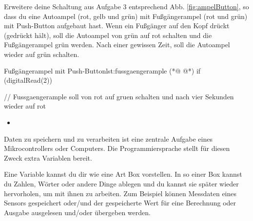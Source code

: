 Erweitere deine Schaltung aus Aufgabe 3 entsprechend Abb. \ref{fig:ampelButton}, so dass du eine Autoampel (rot, gelb und grün) mit Fußgängerampel (rot und grün) mit Push-Button aufgebaut hast. Wenn ein Fußgänger auf den Kopf drückt (gedrückt hält), soll die Autoampel von grün auf rot schalten und die Fußgängerampel grün werden. Nach einer gewissen Zeit, soll die Autoampel wieder auf grün schalten.


\begin{multicols}{2}
\null\vfill 
\begin{arduinoCode}{Fußgängerampel mit Push-Button}{lst:fussgaengerample}
         (*@  @*)
 if (digitalRead(2)) {
    // Fussgaengerample soll von rot auf gruen schalten und nach vier Sekunden wieder auf rot
      
 }
 
\end{arduinoCode}
\vfill\null 
\columnbreak

\null\vfill
\begin{itemize}
  \itemsep15pt
  \item[] 
\end{itemize}
\vfill \null



\end{multicols}



Daten zu speichern und zu verarbeiten ist eine zentrale Aufgabe eines Mikrocontrollers oder Computers. Die Programmiersprache stellt für diesen Zweck extra Variablen bereit.   

Eine Variable kannst du dir wie eine Art Box vorstellen. In so einer Box kannst du Zahlen, Wörter oder andere Dinge ablegen und du kannst sie später wieder hervorholen, um mit ihnen zu arbeiten.  Zum Beispiel können Messdaten eines Sensors gespeichert oder/und der gespeicherte Wert für eine Berechnung oder Ausgabe ausgelesen und/oder übergeben werden.

